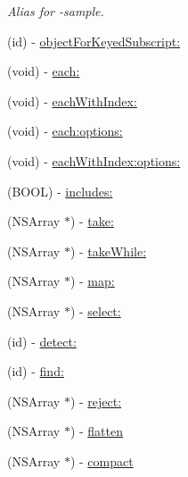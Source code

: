 \begin{DoxyCompactItemize}
\begin{DoxyCompactList}\small\item\em Alias for -\/sample. \end{DoxyCompactList}\item 
(id) -\/ \hyperlink{category_n_s_array_07_objective_sugar_08_ab28554ab4f503b10dee513a99d133c18}{object\+For\+Keyed\+Subscript\+:}
\item 
(void) -\/ \hyperlink{category_n_s_array_07_objective_sugar_08_a639ea8a1dbd1b7f6c35fd27143580990}{each\+:}
\item 
(void) -\/ \hyperlink{category_n_s_array_07_objective_sugar_08_adeeb82cf866eb6b6f0ae0d8a84715df1}{each\+With\+Index\+:}
\item 
(void) -\/ \hyperlink{category_n_s_array_07_objective_sugar_08_a989b3332df424f3077b2caff7f307d1b}{each\+:options\+:}
\item 
(void) -\/ \hyperlink{category_n_s_array_07_objective_sugar_08_aafc09595666407c440e27c76943a670b}{each\+With\+Index\+:options\+:}
\item 
(B\+O\+O\+L) -\/ \hyperlink{category_n_s_array_07_objective_sugar_08_acc4029d39a6f201e5dcaa87cd46e13ab}{includes\+:}
\item 
(N\+S\+Array $\ast$) -\/ \hyperlink{category_n_s_array_07_objective_sugar_08_a1147d9115b1c6665d48fa3cd6d6192d5}{take\+:}
\item 
(N\+S\+Array $\ast$) -\/ \hyperlink{category_n_s_array_07_objective_sugar_08_a70b5cf2b48da03d19987bbd855c245e4}{take\+While\+:}
\item 
(N\+S\+Array $\ast$) -\/ \hyperlink{category_n_s_array_07_objective_sugar_08_a3f63f83cb8aa95dbe6f76cf0bba01ad0}{map\+:}
\item 
(N\+S\+Array $\ast$) -\/ \hyperlink{category_n_s_array_07_objective_sugar_08_a4ce83f57407deb5298b0322e4c329323}{select\+:}
\item 
(id) -\/ \hyperlink{category_n_s_array_07_objective_sugar_08_a2e49ee5f3f372b2da2bc0e35839c8ff8}{detect\+:}
\item 
(id) -\/ \hyperlink{category_n_s_array_07_objective_sugar_08_a17190c280ca5721de858b3e54c3f7e18}{find\+:}
\item 
(N\+S\+Array $\ast$) -\/ \hyperlink{category_n_s_array_07_objective_sugar_08_acd1d6a7f54ec68e1d111c062eac7802d}{reject\+:}
\item 
(N\+S\+Array $\ast$) -\/ \hyperlink{category_n_s_array_07_objective_sugar_08_a6b9d604010b76c4eedbc61e424de3859}{flatten}
\item 
(N\+S\+Array $\ast$) -\/ \hyperlink{category_n_s_array_07_objective_sugar_08_ae871866f8c83a707ca34c8a04242e566}{compact}

\end{DoxyCompactItemize}
